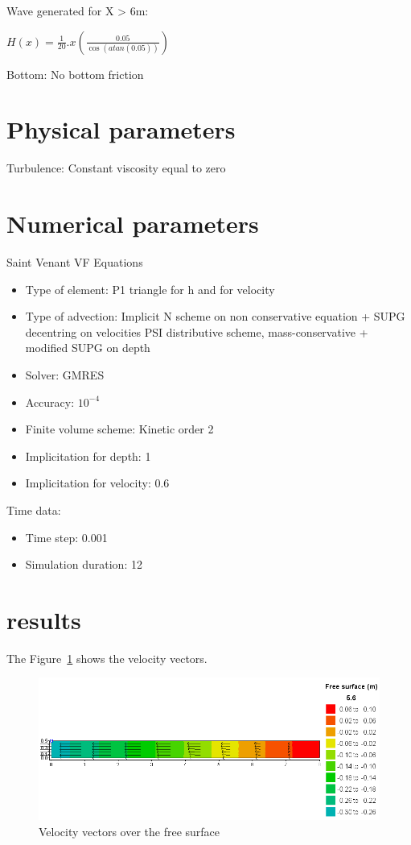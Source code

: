 Wave generated for X > 6m:

$H(x) = \frac{1}{20}.x(\frac{0.05}{\cos(atan(0.05))})$

Bottom: No bottom friction

\section{Physical parameters}

Turbulence: Constant viscosity equal to zero


\section{Numerical parameters}

Saint Venant VF Equations
\begin{itemize}
\item Type of element: P1 triangle for h and for velocity
\item Type of advection:   Implicit N scheme on non conservative equation + SUPG decentring on velocities PSI distributive scheme, mass-conservative + modified SUPG on depth
\item Solver:  GMRES
\item Accuracy:  $10^{-4}$
\item Finite volume scheme:  Kinetic order 2
\item Implicitation for depth:   1
\item Implicitation for velocity:  0.6
\end{itemize}

Time data:
\begin{itemize}
\item Time step: 0.001
\item Simulation duration: 12
\end{itemize}

\section{results}


The Figure~\ref{fig:swash:vel} shows the velocity vectors.
\begin{figure}
\centering
\includegraphics[width=.6\textwidth]{img/vel.png}
\caption{Velocity vectors over the free surface}\label{fig:swash:vel}
\end{figure}

